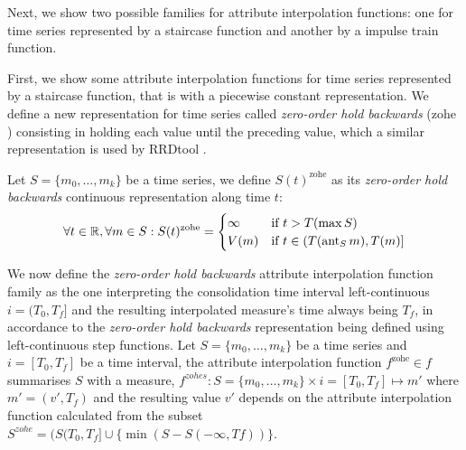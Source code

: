 Next, we show two possible families for attribute interpolation
functions: one for time series represented by a staircase function and
another by a impulse train function.

First, we show some attribute interpolation functions for time series
represented by a staircase function, that is with a piecewise constant
representation.  We define a new representation for time series called
\emph{zero-order hold backwards}
(zohe%
) consisting in holding each value until the preceding value, which a
similar representation is used by RRDtool \cite{lisa98:oetiker}.

Let $S=\{m_0,\ldots,m_k\}$ be a time series, we define
$S(t)^{\text{zohe}}$ as its \emph{zero-order hold backwards}
continuous representation along time $t$:
\[
\forall t \in \mathbb{R}  ,\forall m \in S:
S(t)^{\text{zohe}} =  
\begin{cases}
  \infty & \text{if } t > T(\max S) \\%
  V(m) & \text{if }  t\in (T(\prev_S m),T(m)]
\end{cases}
\]


We now define the \emph{zero-order hold backwards} attribute
interpolation function family as the one interpreting the
consolidation time interval left-continuous $i=(T_0,T_f]$ and the
resulting interpolated measure's time always being $T_f$, in
accordance to the \emph{zero-order hold backwards} representation
being defined using left-continuous step functions.  Let
$S=\{m_0,\ldots,m_k\}$ be a time series and $i=[T_0,T_f]$ be a time
interval, the attribute interpolation function $f^{\text{zohe}}\in f$
summarises $S$ with a measure, $f^{zohes}: S=\{m_0,\ldots,m_k\} \times
i=[T_0,T_f] \mapsto m'$ where $m'=(v',T_f)$ and the resulting value
$v'$ depends on the attribute interpolation function calculated from
the subset $S^{zohe}=(S(T_0,T_f] \cup \{\min(S-S(-\infty,Tf))\}$.


